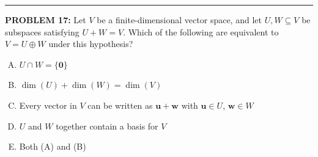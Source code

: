 \documentclass[12pt]{amsart}
\newcommand{\divider}{
  \vspace{-1em} %
  \noindent
  \raisebox{-0.15ex}{\textbullet}%
  \hspace{0.5em}%
  \rule[0.5ex]{0.95\textwidth}{1.0pt}%
  \hspace{0.5em}%
  \raisebox{-0.15ex}{\textbullet}%
  \vspace{0em} %
}
\begin{document}
%
%
\divider

{\bf PROBLEM 17:}
%
Let $V$ be a finite-dimensional vector space, and let $U, W \subseteq V$ be 
subspaces satisfying $U + W = V$. Which of the following are equivalent to $V = U \oplus W$ under this hypothesis?

\begin{enumerate}[(A)]
\item $U \cap W = \{\mathbf{0}\}$
\item $\dim(U) + \dim(W) = \dim(V)$
\item Every vector in $V$ can be written as $\mathbf{u} + \mathbf{w}$ with $\mathbf{u} \in U$, $\mathbf{w} \in W$
\item $U$ and $W$ together contain a basis for $V$
\item Both (A) and (B)
\end{enumerate}
\end{document}
